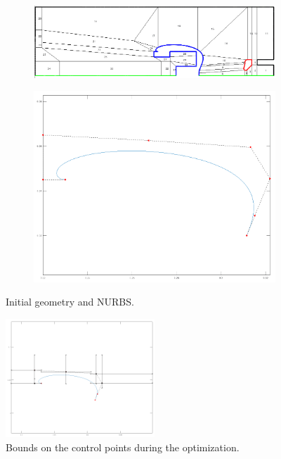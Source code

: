 \begin{center}
\begin{figure}[H]
    \begin{subfigure}{0.45\textwidth}
        \includegraphics[width=\textwidth]{fig/png/geometry_v6_order=8}
    \end{subfigure}
    \begin{subfigure}{0.45\textwidth}
        \includegraphics[width=\textwidth]{fig/png/init_order=8}
    \end{subfigure}
    \caption{Initial geometry and NURBS.}
    \label{fig:init_order=8}
\end{figure}
\end{center}

\begin{center}
\begin{figure}[H]
    \includegraphics[width=0.5\textwidth]{fig/png/bounds_order=8}
    \caption{Bounds on the control points during the optimization.}
    \label{fig:bounds_order=8}
\end{figure}
\end{center}

